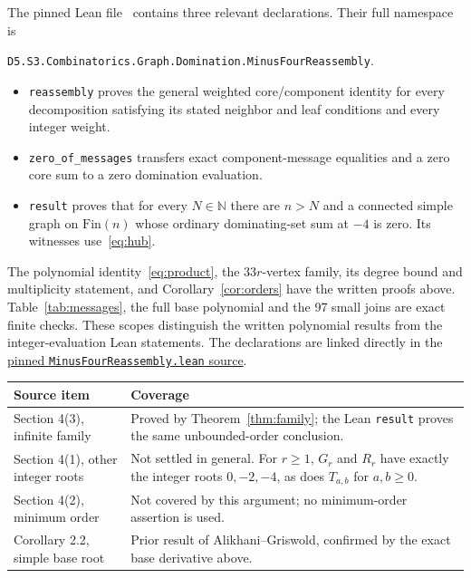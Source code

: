 \documentclass[11pt]{article}
\begin{document}
The pinned Lean file~\cite{Lean} contains three relevant declarations.
Their full namespace is
\begin{flushleft}\small
\nolinkurl{D5.S3.Combinatorics.Graph.Domination.MinusFourReassembly}.
\end{flushleft}
\begin{itemize}
\item \texttt{reassembly} proves the general weighted core/component
identity for every decomposition satisfying its stated neighbor and leaf
conditions and every integer weight.
\item \texttt{zero\_of\_messages} transfers exact component-message
equalities and a zero core sum to a zero domination evaluation.
\item \texttt{result} proves that for every $N\in\mathbb N$ there are
$n>N$ and a connected simple graph on $\mathrm{Fin}(n)$ whose ordinary
dominating-set sum at $-4$ is zero. Its witnesses use~\eqref{eq:hub}.
\end{itemize}
The polynomial identity~\eqref{eq:product}, the $33r$-vertex family,
its degree bound and multiplicity statement, and Corollary~\ref{cor:orders}
have the written proofs
above. Table~\ref{tab:messages}, the full base polynomial and the 97
small joins are exact finite checks. These scopes distinguish the
written polynomial results from the integer-evaluation Lean statements.
The declarations are linked directly in the
\href{https://github.com/the-omega-institute/trureturing/blob/a87bdf39e4517497a9773c0c724243bc700c5bb1/D5/S3/Combinatorics/Graph/Domination/MinusFourReassembly.lean}{pinned \texttt{MinusFourReassembly.lean} source}.

\begin{center}
\begin{tabular}{@{}p{.33\linewidth}p{.60\linewidth}@{}}
\toprule
Source item & Coverage\\
\midrule
Section 4(3), infinite family & Proved by Theorem~\ref{thm:family}; the
Lean \texttt{result} proves the same unbounded-order conclusion.\\[3pt]
Section 4(1), other integer roots & Not settled in general.
For $r\geq1$, $G_r$ and $R_r$ have exactly the integer roots $0,-2,-4$,
as does $T_{a,b}$ for $a,b\geq0$.\\[3pt]
Section 4(2), minimum order & Not covered by this argument; no
minimum-order assertion is used.\\[3pt]
Corollary 2.2, simple base root & Prior result of Alikhani--Griswold,
confirmed by the exact base derivative above.\\
\bottomrule
\end{tabular}
\end{center}
\end{document}
